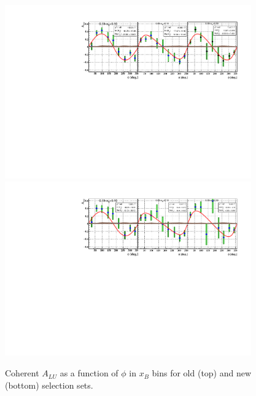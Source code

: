 \begin{figure}[h!]
\centering
\includegraphics[height=7.5cm]{old_plots/f_coh_alu_xB_phi.pdf}
\includegraphics[height=7.5cm]{new_plots/Coh_ALU_xB_phi.pdf}
\caption{Coherent $A_{LU}$ as a function of $\phi$ in $x_{B}$ bins for old 
(top) and new (bottom) selection sets.}
\label{fig:ALU_xB_phi}
\end{figure}


